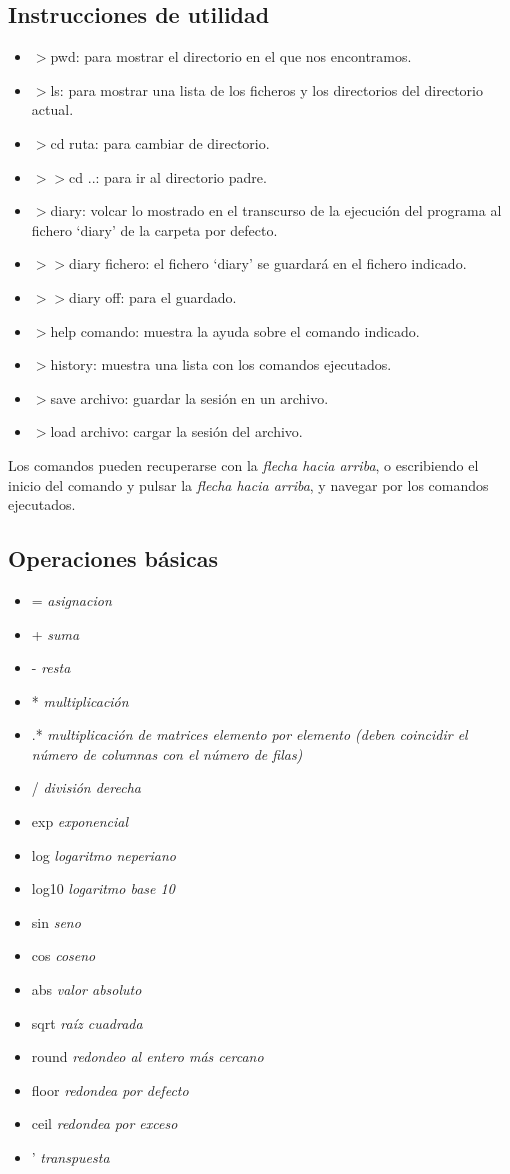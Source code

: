 \documentclass[a4,12pt]{article}
\begin{document}
\subsection{Instrucciones de utilidad}
\begin{itemize}
\item$>$pwd: para mostrar el directorio en el que nos encontramos.
\item$>$ls: para mostrar una lista de los ficheros y los directorios del directorio actual.
\item$>$cd ruta: para cambiar de directorio.
\item$>>$cd ..: para ir al directorio padre.
\item$>$diary: volcar lo mostrado en el transcurso de la ejecución del programa al fichero ‘diary’ de la carpeta por defecto.
\item$>>$diary fichero: el fichero ‘diary’ se guardará en el fichero indicado.
\item$>>$diary off: para el guardado.
\item$>$help comando: muestra la ayuda sobre el comando indicado.
\item$>$history: muestra una lista con los comandos ejecutados.
\item$>$save archivo: guardar la sesión en un archivo.
\item$>$load archivo: cargar la sesión del archivo.
\end{itemize}
Los comandos pueden recuperarse con la \emph{flecha hacia arriba}, o escribiendo el inicio del comando y pulsar la \emph{flecha hacia arriba}, y navegar por los comandos ejecutados.
\subsection{Operaciones básicas}
\begin{itemize}
\item= \emph{asignacion}
\item+ \emph{suma}
\item- \emph{resta}
\item* \emph{multiplicación}
\item.* \emph{multiplicación de matrices elemento por elemento (deben coincidir el número de columnas con el número de filas)}
\item/ \emph{división derecha}
\item exp \emph{exponencial}
\item log \emph{logaritmo neperiano}
\item log10 \emph{logaritmo base 10}
\item sin \emph{seno}
\item cos \emph{coseno}
\item abs \emph{valor absoluto}
\item sqrt \emph{raíz cuadrada}
\item round \emph{redondeo al entero más cercano}
\item floor \emph{redondea por defecto}
\item ceil \emph{redondea por exceso}
\item ' \emph{transpuesta}
\end{itemize}
\end{document}
